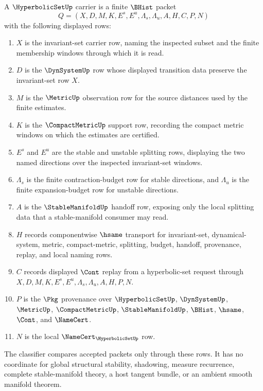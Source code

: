 \begin{definition}
\label{def:hyperbolic-set-carrier}
A $\HyperbolicSetUp$ carrier is a finite $\BHist$ packet
$$
Q=(X,D,M,K,E^s,E^u,\Lambda_s,\Lambda_u,A,H,C,P,N)
$$
with the following displayed rows:
\begin{enumerate}
\item $X$ is the invariant-set carrier row, naming the inspected subset and
the finite membership windows through which it is read.
\item $D$ is the $\DynSystemUp$ row whose displayed transition data preserve
the invariant-set row $X$.
\item $M$ is the $\MetricUp$ observation row for the source distances used by
the finite estimates.
\item $K$ is the $\CompactMetricUp$ support row, recording the compact metric
windows on which the estimates are certified.
\item $E^s$ and $E^u$ are the stable and unstable splitting rows, displaying
the two named directions over the inspected invariant-set windows.
\item $\Lambda_s$ is the finite contraction-budget row for stable directions,
and $\Lambda_u$ is the finite expansion-budget row for unstable directions.
\item $A$ is the $\StableManifoldUp$ handoff row, exposing only the local
splitting data that a stable-manifold consumer may read.
\item $H$ records componentwise $\hsame$ transport for invariant-set,
dynamical-system, metric, compact-metric, splitting, budget, handoff,
provenance, replay, and local naming rows.
\item $C$ records displayed $\Cont$ replay from a hyperbolic-set request
through $X,D,M,K,E^s,E^u,\Lambda_s,\Lambda_u,A,H,P,N$.
\item $P$ is the $\Pkg$ provenance over $\HyperbolicSetUp$, $\DynSystemUp$,
$\MetricUp$, $\CompactMetricUp$, $\StableManifoldUp$, $\BHist$, $\hsame$,
$\Cont$, and $\NameCert$.
\item $N$ is the local $\NameCert_{\HyperbolicSetUp}$ row.
\end{enumerate}
The classifier compares accepted packets only through these rows. It has no
coordinate for global structural stability, shadowing, measure recurrence,
complete stable-manifold theory, a host tangent bundle, or an ambient smooth
manifold theorem.
\end{definition}

